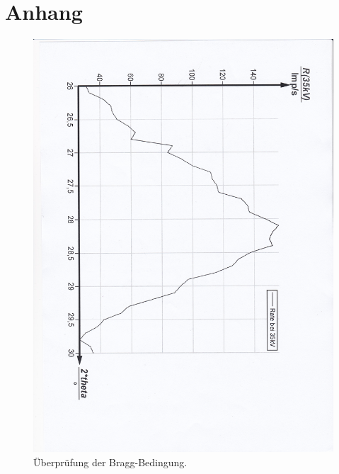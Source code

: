 \newpage
\section{Anhang}
\begin{figure}[p]
  \centering
  \includegraphics[width=\textwidth]{content/Ueberpruefung.jpg}
  \caption{Überprüfung der Bragg-Bedingung.}
  \label{Bild:1}
\end{figure}
